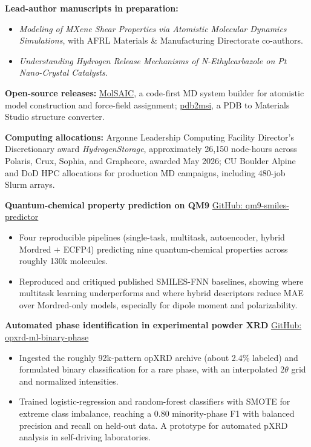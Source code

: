 \documentclass[letterpaper,10pt]{article}
\newcommand{\keep}{\needspace{4\baselineskip}}
\begin{document}
\keep\textbf{Lead-author manuscripts in preparation:}
\begin{itemize}
    \item \textit{Modeling of MXene Shear Properties via Atomistic Molecular Dynamics Simulations}, with AFRL Materials \& Manufacturing Directorate co-authors.
    \item \textit{Understanding Hydrogen Release Mechanisms of N-Ethylcarbazole on Pt Nano-Crystal Catalysts}.
\end{itemize}

\textbf{Open-source releases:} \href{https://github.com/fl-sean03/MolSAICV4}{MolSAIC}, a code-first MD system builder for atomistic model construction and force-field assignment; \href{https://github.com/fl-sean03/pdb2msi}{pdb2msi}, a PDB to Materials Studio structure converter.

\textbf{Computing allocations:} Argonne Leadership Computing Facility Director's Discretionary award \textit{HydrogenStorage}, approximately 26,150 node-hours across Polaris, Crux, Sophia, and Graphcore, awarded May 2026; CU Boulder Alpine and DoD HPC allocations for production MD campaigns, including 480-job Slurm arrays.

\keep\textbf{Quantum-chemical property prediction on QM9} \hfill \href{https://github.com/fl-sean03/qm9-smiles-predictor}{GitHub: qm9-smiles-predictor}
\begin{itemize}
    \item Four reproducible pipelines (single-task, multitask, autoencoder, hybrid Mordred \(+\) ECFP4) predicting nine quantum-chemical properties across roughly 130k molecules.
    \item Reproduced and critiqued published SMILES-FNN baselines, showing where multitask learning underperforms and where hybrid descriptors reduce MAE over Mordred-only models, especially for dipole moment and polarizability.
\end{itemize}

\keep\textbf{Automated phase identification in experimental powder XRD} \hfill \href{https://github.com/fl-sean03/opxrd-ml-binary-phase}{GitHub: opxrd-ml-binary-phase}
\begin{itemize}
    \item Ingested the roughly 92k-pattern opXRD archive (about 2.4\% labeled) and formulated binary classification for a rare phase, with an interpolated 2\(\theta\) grid and normalized intensities.
    \item Trained logistic-regression and random-forest classifiers with SMOTE for extreme class imbalance, reaching a 0.80 minority-phase F1 with balanced precision and recall on held-out data. A prototype for automated pXRD analysis in self-driving laboratories.
\end{itemize}
\end{document}
